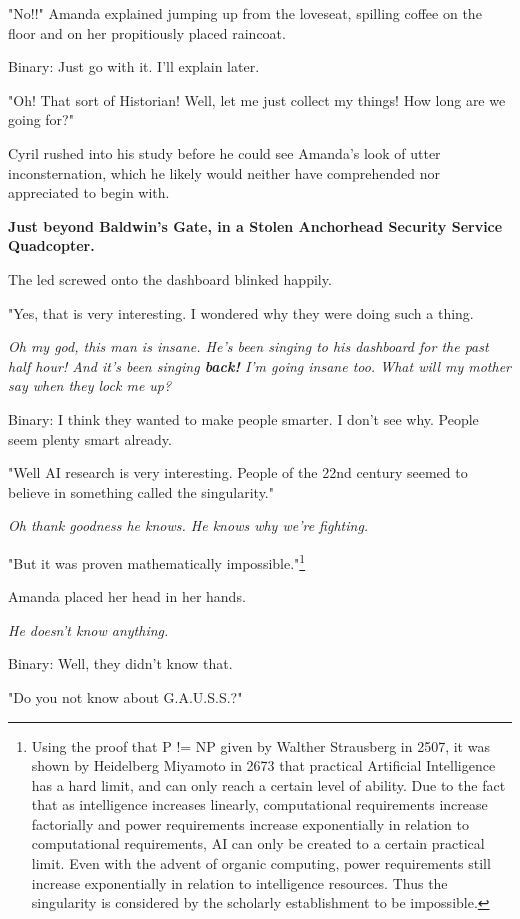 \documentclass[12pt]{article}
\begin{document}
"No!!" Amanda explained jumping up from the loveseat, spilling coffee on the floor and on her propitiously placed raincoat.

Binary: Just go with it. I'll explain later.

"Oh! That sort of Historian! Well, let me just collect my things! How long are we going for?"

Cyril rushed into his study before he could see Amanda's look of utter inconsternation, which he likely would neither have comprehended nor appreciated to begin with.

\textbf{Just beyond Baldwin's Gate, in a Stolen Anchorhead Security Service Quadcopter.}

The led screwed onto the dashboard blinked happily.

"Yes, that is very interesting. I wondered why they were doing such a thing.

\emph{Oh my god, this man is insane. He's been singing to his dashboard for the past half hour! And it's been singing \textbf{back!} I'm going insane too. What will my mother say when they lock me up?}

Binary: I think they wanted to make people smarter. I don't see why. People seem plenty smart already.

"Well AI research is very interesting. People of the 22nd century seemed to believe in something called the singularity."

\emph{Oh thank goodness he knows. He knows why we're fighting.}

"But it was proven mathematically impossible."\footnote{Using the proof that P != NP given by Walther Strausberg in 2507, it was shown by Heidelberg Miyamoto in 2673 that practical Artificial Intelligence has a hard limit, and can only reach a certain level of ability. Due to the fact that as intelligence increases linearly, computational requirements increase factorially and power requirements increase exponentially in relation to computational requirements, AI can only be created to a certain practical limit. Even with the advent of organic computing, power requirements still increase exponentially in relation to intelligence resources. Thus the singularity is considered by the scholarly establishment to be impossible.}

Amanda placed her head in her hands.

\emph{He doesn't know anything.}

Binary: Well, they didn't know that.

"Do you not know about G.A.U.S.S.?"
\end{document}
